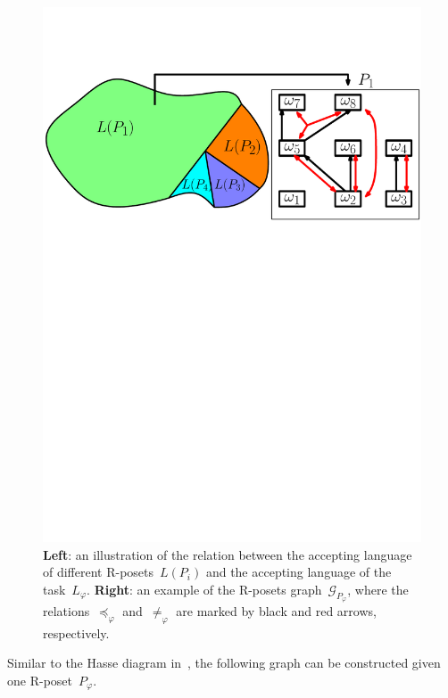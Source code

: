 \begin{figure}[t!]
	\includegraphics[width=0.85\linewidth]{figures/poset_language2.pdf}
	\centering
\caption{\textbf{Left}:
an illustration of the relation between the accepting
language of different R-posets~$L(P_i)$
and the accepting language of the task~$L_\varphi$.
\textbf{Right}:
an example of the R-posets graph~$\mathcal{G}_{P_\varphi}$,
where the relations~$\preceq_{\varphi}$ and~$\neq_{\varphi}$
are marked by black and red arrows, respectively.}
\label{fig:poset_language}
\end{figure}

Similar to the Hasse diagram in~\citep{simovici2008mathematical},
the following graph can be constructed given one R-poset~$P_{\varphi}$.

